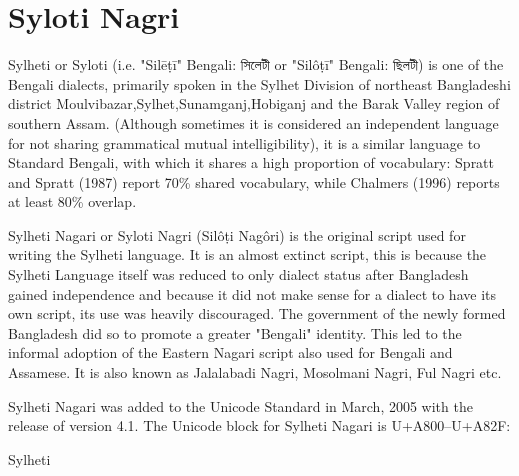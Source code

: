 \section{Syloti Nagri}
\label{s:sylotinagri}
\newfontfamily{}
\newfontfamily{}

Sylheti or Syloti (i.e. "Silēṭī" Bengali: সিলেটী or "Silôṭī" Bengali: ছিলটী) is one of the Bengali dialects, primarily spoken in the Sylhet Division of northeast Bangladeshi district Moulvibazar,Sylhet,Sunamganj,Hobiganj and the Barak Valley region of southern Assam. (Although sometimes it is considered an independent language for not sharing grammatical mutual intelligibility), it is a similar language to Standard Bengali, with which it shares a high proportion of vocabulary: Spratt and Spratt (1987) report 70\% shared vocabulary, while Chalmers (1996) reports at least 80\% overlap.

Sylheti Nagari or Syloti Nagri (Silôṭi Nagôri) is the original script used for writing the Sylheti language. It is an almost extinct script, this is because the Sylheti Language itself was reduced to only dialect status after Bangladesh gained independence and because it did not make sense for a dialect to have its own script, its use was heavily discouraged. The government of the newly formed Bangladesh did so to promote a greater "Bengali" identity. This led to the informal adoption of the Eastern Nagari script also used for Bengali and Assamese. It is also known as Jalalabadi Nagri, Mosolmani Nagri, Ful Nagri etc.

Sylheti Nagari was added to the Unicode Standard in March, 2005 with the release of version 4.1.
The Unicode block for Sylheti Nagari is U+A800–U+A82F:

\begin{scriptexample}[]{Sylheti}
\end{scriptexample}


